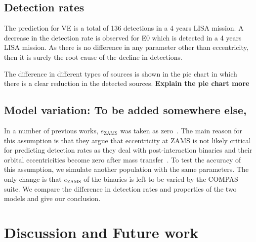\documentclass[journal, twocolumn]{IEEEtran}
\begin{document}
	
    \subsection{Detection rates}\label{subsec:detectionetection-rates}
    The prediction for VE is a total of 136 detections in a 4 years LISA mission.
    A decrease in the detection rate is observed for E0 which is detected in a 4 years LISA mission.
    As there is no difference in any parameter other than eccentricity, then it is surely the root cause of the decline in detections.

    The difference in different types of sources is shown in the pie chart in which there is a clear reduction in the detected sources. \textbf{Explain the pie chart more}


    \subsection{Model variation: To be added somewhere else,}
    \label{subsec:model_variation}
    In a number of previous works, $e_\text{ZAMS}$ was taken as zero~\cite{Vigna2018, Barrett2018, Lau2020, Broekgaarden2021, wagg2021gravitational}.
    The main reason for this assumption is that they argue that eccentricity at ZAMS is not likely critical for predicting detection rates as they deal with post-interaction binaries and their orbital eccentricities become zero after mass transfer~\cite{Hurley2002}. %
    To test the accuracy of this assumption, we simulate another population with the same parameters.
    The only change is that $e_\text{ZAMS}$ of the binaries is left to be varied by the COMPAS suite.
    We compare the difference in detection rates and properties of the two models and give our conclusion.


    \section{Discussion and Future work}\label{sec:df}
    \ifCLASSOPTIONcaptionsoff
    \newpage
    \fi

    \cleardoublepage
    
    

    \cleardoublepage
    \appendices
    
    \newpage
    
    \newpage
    
\end{document}
